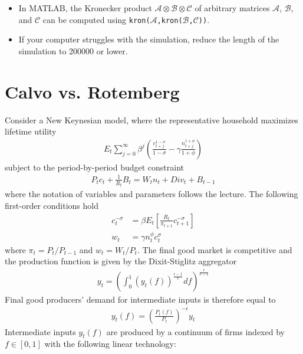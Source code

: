 \documentclass{article}
\numberwithin{equation}{section}
\begin{document}
\begin{itemize}
\item
In MATLAB, the Kronecker product \(\mathcal{A} \otimes \mathcal{B} \otimes \mathcal{C}\) of arbitrary matrices \(\mathcal{A}\), \(\mathcal{B}\), and \(\mathcal{C}\)
  can be computed using \texttt{kron{(\(\mathcal{A}\),kron{(\(\mathcal{B}\),\(\mathcal{C}\))})}}.

\item
If your computer struggles with the simulation, reduce the length of the simulation to 200000 or lower.
\end{itemize}

\newpage


\section[Calvo vs. Rotemberg]{Calvo vs. Rotemberg\label{ex:CalvoRotemberg}}
Consider a New Keynesian model, where the representative household maximizes lifetime utility
\begin{align*} 
E_t \sum_{j=0}^\infty \beta^j\left( \frac{c_{t+j}^{1-\sigma}}{1-\sigma} - \gamma \frac{n_{t+j}^{1+\phi}}{1+\phi} \right)
\end{align*}
subject to the period-by-period budget constraint
\begin{align*}
P_t c_t + \frac{1}{R_t} B_t = W_t n_t + Div_t + B_{t-1}
\end{align*}
where the notation of variables and parameters follows the lecture.
The following first-order conditions hold
\begin{align}
c_t^{-\sigma} &= \beta E_t \left[ \frac{R_t}{\pi_{t+1}} c_{t+1}^{-\sigma}  \right] \label{eq:CalvoRotemberg:Euler}
\\
w_t &= \gamma n_t^\phi c_t^\sigma \label{eq:CalvoRotemberg:LaborSupply}
\end{align}
where \(\pi_t = P_t/P_{t-1}\) and \(w_t = W_t/P_t\).
The final good market is competitive and the production function is given by the Dixit-Stiglitz aggregator
\begin{align*}
y_t = {\left(\int_0^1 {(y_t(f))}^{\frac{\epsilon-1}{\epsilon}}df\right)}^{\frac{\epsilon}{\epsilon-1}}
\end{align*}
Final good producers' demand for intermediate inputs is therefore equal to
\begin{align*}
y_t(f) = {\left(\frac{P_t(f)}{P_t}\right)}^{-\epsilon} y_t
\end{align*} 
Intermediate inputs \(y_t(f)\) are produced by a continuum of firms indexed by \(f\in[0,1]\) with the following linear technology:
\end{document}
